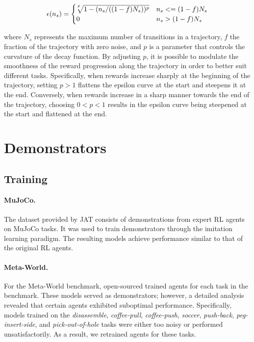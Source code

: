 \documentclass{article}
\theoremstyle{plain}
\theoremstyle{definition}
\theoremstyle{remark}
\begin{document}
\begin{equation*}
\epsilon(n_s) = 
 \begin{cases}
   \sqrt[\leftroot{2} \uproot{5} p]{1-(n_s/((1-f)N_s))^p} &\text{$n_s <= (1-f)N_s$}\\
   0 &\text{$n_s > (1-f)N_s$}
 \end{cases}
\end{equation*}

where $N_s$ represents the maximum number of transitions in a trajectory, $f$ the fraction of the trajectory with zero noise, and $p$ is a parameter that controls the curvature of the decay function. By adjusting $p$, it is possible to modulate the smoothness of the reward progression along the trajectory in order to better suit different tasks. Specifically, when rewards increase sharply at the beginning of the trajectory, setting $p > 1$ flattens the epsilon curve at the start and steepens it at the end. Conversely, when rewards increase in a sharp manner towards the end of the trajectory, choosing $0 < p < 1$ results in the epsilon curve being steepened at the start and flattened at the end.

\section{Demonstrators}\label{appendix:demonstrators}
\subsection{Training}\label{appendix:demonstrators:training}
 
\paragraph{MuJoCo.} The dataset provided by JAT \cite{gallouédec2024jacktradesmastersome} consists of demonstrations from expert RL agents on MuJoCo \cite{6386109} tasks. It was used to train demonstrators through the imitation learning paradigm. The resulting models achieve performance similar to that of the original RL agents.

\paragraph{Meta-World.} For the Meta-World \cite{yu2021metaworldbenchmarkevaluationmultitask} benchmark, \citet{gallouédec2024jacktradesmastersome} open-sourced trained agents for each task in the benchmark. These models served as demonstrators; however, a detailed analysis revealed that certain agents exhibited suboptimal performance. Specifically, models trained on the \textit{disassemble}, \textit{coffee-pull}, \textit{coffee-push}, \textit{soccer}, \textit{push-back}, \textit{peg-insert-side}, and \textit{pick-out-of-hole} tasks were either too noisy or performed unsatisfactorily. As a result, we retrained agents for these tasks.
\end{document}
